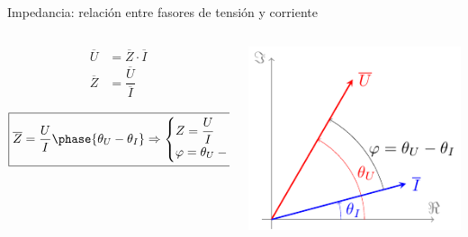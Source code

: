 \documentclass[aspectratio=169, usenames,svgnames,dvipsnames]{beamer}
\begin{document}
\begin{frame}[label={sec:org888b83d}]{Impedancia: relación entre fasores de tensión y corriente}
\begin{columns}
\begin{column}{0.5\columnwidth}
\begin{align*}
  \overline{U} &= \overline{Z} \cdot \overline{I}\\                 
  \overline{Z} &= \dfrac{\overline{U}}{\overline{I}}
\end{align*}

\[
\boxed{\overline{Z} = \dfrac{U}{I}\phase{\theta_U - \theta_I} \Rightarrow 
    \begin{cases}
      Z = \dfrac{U}{I}\\
      \varphi = \theta_U - \theta_I
    \end{cases}}
\]
\end{column}

\begin{column}{0.5\columnwidth}
\begin{center}
\includegraphics[height=0.5\textheight]{../figs/fasorTensionCorriente.pdf}
\end{center}
\end{column}
\end{columns}
\end{frame}
\end{document}
